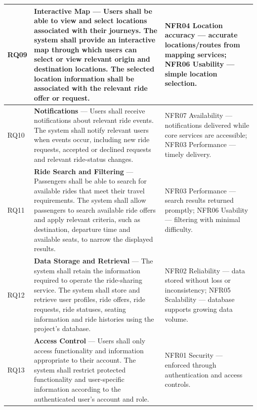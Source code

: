 \begin{longtable}{|>{\raggedright\arraybackslash}p{}
                   |>{\raggedright\arraybackslash}p{}
                   |>{\raggedright\arraybackslash}p{}|}
RQ09 & \textbf{Interactive Map} --- Users shall be able to view and select locations associated with their journeys. The system shall provide an interactive map through which users can select or view relevant origin and destination locations. The selected location information shall be associated with the relevant ride offer or request. & NFR04 Location accuracy --- accurate locations/routes from mapping services; \newline NFR06 Usability --- simple location selection. \\
\hline

RQ10 & \textbf{Notifications} --- Users shall receive notifications about relevant ride events. The system shall notify relevant users when events occur, including new ride requests, accepted or declined requests and relevant ride-status changes. & NFR07 Availability --- notifications delivered while core services are accessible; \newline NFR03 Performance --- timely delivery. \\
\hline

RQ11 & \textbf{Ride Search and Filtering} --- Passengers shall be able to search for available rides that meet their travel requirements. The system shall allow passengers to search available ride offers and apply relevant criteria, such as destination, departure time and available seats, to narrow the displayed results. & NFR03 Performance --- search results returned promptly; \newline NFR06 Usability --- filtering with minimal difficulty. \\
\hline

RQ12 & \textbf{Data Storage and Retrieval} --- The system shall retain the information required to operate the ride-sharing service. The system shall store and retrieve user profiles, ride offers, ride requests, ride statuses, seating information and ride histories using the project's database. & NFR02 Reliability --- data stored without loss or inconsistency; \newline NFR05 Scalability --- database supports growing data volume. \\
\hline

RQ13 & \textbf{Access Control} --- Users shall only access functionality and information appropriate to their account. The system shall restrict protected functionality and user-specific information according to the authenticated user's account and role. & NFR01 Security --- enforced through authentication and access controls. \\
\hline


\end{longtable}
